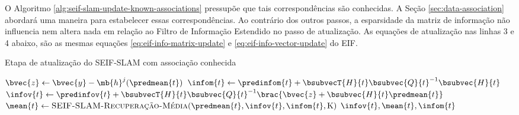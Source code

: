 O Algoritmo \ref{alg:seif-slam-update-known-associations} pressupõe que tais correspondências são 
conhecidas. A Seção \ref{sec:data-association} abordará uma maneira para estabelecer essas correspondências. 
Ao contrário dos outros passos, a esparsidade da 
matriz de informação não influencia nem altera nada em relação ao 
Filtro de Informação Estendido no passo de atualização. As equações de atualização nas linhas 
3 e 4 abaixo, são as mesmas equações \ref{eq:eif-info-matrix-update} e 
\ref{eq:eif-info-vector-update} do EIF.

\begin{algorithm}[h]
  \caption{Etapa de atualização do SEIF-SLAM com associação conhecida}
  \label{alg:seif-slam-update-known-associations}
\begin{algorithmic}[1]
  \State $\bvec{z} \gets \bvec{y} - \mb{h}^j(\predmean{t})$
  \State $\infom{t} \gets \predinfom{t} + \bsubvecT{H}{t} \bsubvec{Q}{t}^{-1} \bsubvec{H}{t}$
  \State $\infov{t} \gets \predinfov{t} + \bsubvecT{H}{t}\bsubvec{Q}{t}^{-1} 
  \brac{\bvec{z} + \bsubvec{H}{t}\predmean{t}}$
  \State $\mean{t} \gets \textproc{SEIF-SLAM-Recuperação-Média}(\predmean{t}, \infov{t}, \infom{t}, \mathrm{K})$
  \State \Return $\infov{t}, \mean{t}, \infom{t}$
  \EndProcedure
\end{algorithmic}
\end{algorithm}


